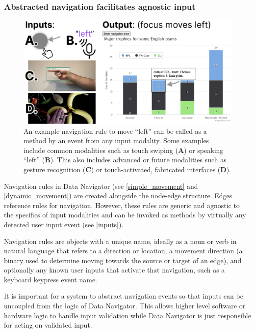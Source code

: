 \documentclass[journal]{vgtc}                %
\begin{document}
\subsubsection{Abstracted navigation facilitates agnostic input}
\begin{figure}[h]
  \centering
  \includegraphics[width=\linewidth]{figures/inputs.png}
  \caption{An example navigation rule to move ``left'' can be called as a method by an event from any input modality. Some examples include common modalities such as touch swiping (\textbf{A}) or speaking ``left'' (\textbf{B}). This also includes advanced or future modalities such as gesture recognition (\textbf{C}) or touch-activated, fabricated interfaces (\textbf{D}).}
  \label{inputs}
\end{figure}
Navigation rules in Data Navigator (see \autoref{simple_movement} and \autoref{dynamic_movement}) are created alongside the node-edge structure. Edges reference rules for navigation. However, these rules are generic and agnostic to the specifics of input modalities and can be invoked as methods by virtually any detected user input event (see \autoref{inputs}).

Navigation rules are objects with a unique name, ideally as a noun or verb in natural language that refers to a direction or location, a movement direction (a binary used to determine moving towards the source or target of an edge), and optionally any known user inputs that activate that navigation, such as a keyboard keypress event name.

It is important for a system to abstract navigation events so that inputs can be uncoupled from the logic of Data Navigator. This allows higher level software or hardware logic to handle input validation while Data Navigator is just responsible for acting on validated input.
\end{document}
